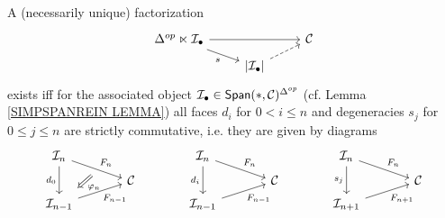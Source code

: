 \documentclass[a4paper,10pt]{article}%
\begin{document}
\begin{lemma}\label{SOURCEFACT LEM}
  A (necessarily unique) factorization
  \begin{equation}\label{SOURCEFACT EQ}
    \begin{tikzcd}[row sep = 0.5em]
      \Delta^{op} \ltimes \mcI_{\bullet} \ar{rr} \ar{rd}[swap]{s}& & \C \\
      & \left|\mcI_{\bullet}\right| \ar[dashed]{ru}
    \end{tikzcd}
  \end{equation}
  exists iff for the associated object 
  $\mcI_{\bullet} \in \mathsf{Span}(\**,\C)^{\Delta^{op}}$
  (cf. Lemma \ref{SIMPSPANREIN LEMMA})
  all faces $d_i$ for $0<i\leq n$ and degeneracies $s_j$ for $0\leq j \leq n$ are strictly commutative, i.e. they are given by diagrams
  \begin{equation}\label{IDENTSIMPRELS EQ}
    \begin{tikzcd}[row sep=0.4em,column sep = 3.5em]
      \mathcal{I}_n
      \ar{dr}[name=F1]{F_n} \ar{dd}[swap]{d_0} & &
      \mathcal{I}_n
      \ar{dr}{F_n} \ar{dd}[swap]{d_i} & &
      \mathcal{I}_n
      \ar{dr}{F_n} \ar{dd}[swap]{s_j} &
      \\
      & \C & & \C & & \C
      \\
      |[alias=G2]| \mathcal{I}_{n-1}  \ar{ur}[swap]{F_{n-1}} & & 
      \mathcal{I}_{n-1}  \ar{ur}[swap]{F_{n-1}} & &
      \mathcal{I}_{n+1}  \ar{ur}[swap]{F_{n+1}} &
      \arrow[Rightarrow, from=F1, to=G2,shorten >=0.25cm,shorten <=0.25cm,"\varphi_n"]
    \end{tikzcd}
  \end{equation}
\end{lemma}
\end{document}
